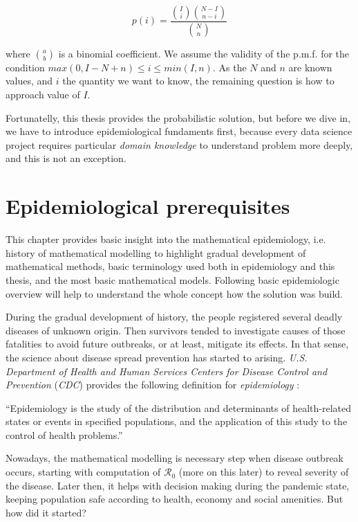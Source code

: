 \documentclass[
  digital, %
  oneside, %
  lof,     %
  lot,     %
]{fithesis4}
\begin{document}
\begin{equation}
  p(i) = \frac{ \binom{I}{i} \binom{N - I}{n - i} }{ \binom{N}{n} }
\end{equation}

where $\binom{a}{b}$ is a binomial coefficient.
We assume the validity of the p.m.f. for the condition
$max\left( 0, I - N + n \right) \leq i \leq min\left( I, n \right)$.
As the $N$ and $n$ are known values, and $i$ the quantity we want 
to know, the remaining question is how to approach value of $I$.

Fortunatelly, this thesis provides the probabilistic solution,
but before we dive in, we have to introduce
epidemiological fundaments first, because every data science
project requires particular \textit{domain knowledge} to
understand problem more deeply, and this is not an exception.


\chapter{Epidemiological prerequisites}
\label{chap:epidemiological-prerequisites}

This chapter provides basic insight into the mathematical
epidemiology, 
i.e. history of mathematical modelling to highlight gradual 
development of mathematical methods, basic terminology 
used both in epidemiology and this thesis, and the most 
basic mathematical models.
Following basic epidemiologic 
overview will help to understand the whole concept how 
the solution was build.

During the gradual development of history,
the people registered several deadly diseases of unknown origin.
Then survivors tended to investigate causes of those 
fatalities to avoid future outbreaks, or at least, mitigate its effects.
In that sense, the science about disease spread 
prevention has started to arising.
\textit{U.S. Department of Health and Human Services Centers 
for Disease Control and Prevention} (\textit{CDC}) provides the 
following definition for \textit{epidemiology} \cite{cdc2006}:

\begin{displayquote}
  ``Epidemiology is the study of the distribution and
  determinants of health-related states or events in specified
  populations, and the application of this study to the control
  of health problems.''
\end{displayquote}

Nowadays, the mathematical modelling is necessary 
step when disease outbreak occurs, starting with computation 
of $\mathcal{R}_0$ (more on this later) to reveal severity 
of the disease.
Later then, it helps with decision 
making during the pandemic state, keeping population safe 
according to health, economy and social amenities.
But how did it started?
\end{document}
